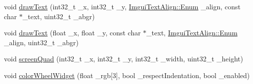 \begin{DoxyCompactItemize}
\item 
void \hyperlink{struct_imgui_a1a56de6ca760f7ab95eee560ad9a9c21}{draw\+Text} (int32\+\_\+t \+\_\+x, int32\+\_\+t \+\_\+y, \hyperlink{struct_imgui_text_align_a8e5bef09f173b67144ba413e0ed392b1}{Imgui\+Text\+Align\+::\+Enum} \+\_\+align, const char $\ast$\+\_\+text, uint32\+\_\+t \+\_\+abgr)
\item 
void \hyperlink{struct_imgui_aa9855b572739855229c4858cb3a01909}{draw\+Text} (float \+\_\+x, float \+\_\+y, const char $\ast$\+\_\+text, \hyperlink{struct_imgui_text_align_a8e5bef09f173b67144ba413e0ed392b1}{Imgui\+Text\+Align\+::\+Enum} \+\_\+align, uint32\+\_\+t \+\_\+abgr)
\item 
void \hyperlink{struct_imgui_a85510a065c1d98f43142d6fdb885699d}{screen\+Quad} (int32\+\_\+t \+\_\+x, int32\+\_\+t \+\_\+y, int32\+\_\+t \+\_\+width, uint32\+\_\+t \+\_\+height)
\item 
void \hyperlink{struct_imgui_a6a042945fa89fe0c98016074f03d0b20}{color\+Wheel\+Widget} (float \+\_\+rgb\mbox{[}3\mbox{]}, bool \+\_\+respect\+Indentation, bool \+\_\+enabled)
\end{DoxyCompactItemize}
